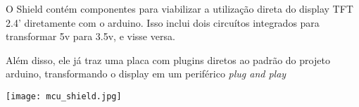 \documentclass[12pt]{article}
\begin{document}
O Shield contém componentes para viabilizar a utilização direta do display TFT 2.4' diretamente com o arduino. Isso inclui dois circuítos integrados para transformar 5v para 3.5v, e visse versa.

Além disso, ele já traz uma placa com plugins diretos ao padrão do projeto arduino, transformando o display em um periférico \textit{plug and play}
\begin{center}
	\texttt{[image: mcu\_shield.jpg]}
\end{center}




\nocite{*}
\end{document}
